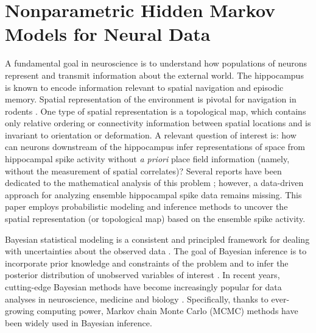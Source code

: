  
\chapter{Nonparametric Hidden Markov Models for Neural Data}

A fundamental goal in neuroscience is to understand how populations of
neurons represent and transmit information about the external world.
The hippocampus is known to encode information relevant to spatial
navigation and episodic memory.  Spatial representation of the
environment is pivotal for navigation in rodents \citep{OKeefe78}.
One type of spatial representation is a topological map, which
contains only relative ordering or connectivity information between
spatial locations and is invariant to orientation or deformation. A
relevant question of interest is: how can neurons downstream of the
hippocampus infer representations of space from hippocampal spike
activity without {\em a priori} place field information (namely,
without the measurement of spatial correlates)?  Several reports have
been dedicated to the mathematical analysis of this problem
\citep{Curto08,Dabaghian12}; however, a data-driven approach for
analyzing ensemble hippocampal spike data remains missing.  This paper
employs probabilistic modeling and inference methods to uncover the
spatial representation (or topological map) based on the ensemble
spike activity.


Bayesian statistical modeling is a consistent and principled framework
for dealing with uncertainties about the observed data
\citep{Scott02}.  The goal of Bayesian inference is to incorporate
prior knowledge and constraints of the problem and to infer the
posterior distribution of unobserved variables of interest
\citep{Gelman13}. In recent years, cutting-edge Bayesian methods have
become increasingly popular for data analyses in neuroscience,
medicine and biology
\citep{Mishchenko11a,Chen11,Chen13,Davidson09,Kloosterman14,Yau11}. Specifically,
thanks to ever-growing computing power, Markov chain Monte Carlo
(MCMC) methods have been widely used in Bayesian inference.


